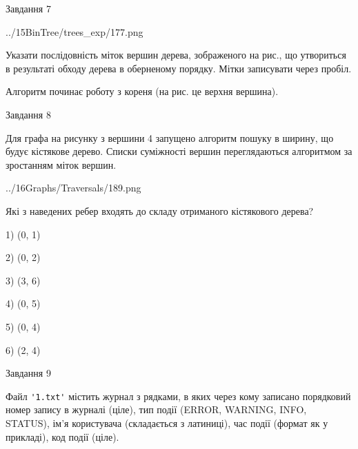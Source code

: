 \documentclass[12pt, ukrainian]{article}
\def\code#1{\Verb!#1!}
\begin{document}
{\vspace{10mm}\par

\newpage
\begin{minipage}[t]{9.7cm}
               
{\begin{center}Завдання {7}\end{center}}
\vspace{-4mm}

\begin{center}
	{../15BinTree/trees_exp/177.png}
\end{center}
Указати послідовність міток вершин дерева, зображеного на рис., що утвориться в результаті обходу дерева в оберненому порядку. Мітки записувати через пробіл.\par Алгоритм починає роботу з кореня (на рис. це верхня вершина).\par

\end{minipage}
\vline \hspace{8mm}
\begin{minipage}[t]{8.0cm}
               
{\begin{center}Завдання {8}\end{center}}
\vspace{-4mm}
Для графа на рисунку з вершини 4 запущено алгоритм пошуку в ширину, що будує кістякове дерево. Списки суміжності вершин переглядаються алгоритмом за зростанням міток вершин.\par
\begin{center}
	{../16Graphs/Traversals/189.png}
\end{center}
\par Які з наведених ребер входять до складу отриманого кістякового дерева?\par
1) (0, 1)\par
2) (0, 2)\par
3) (3, 6)\par
4) (0, 5)\par
5) (0, 4)\par
6) (2, 4)\par
{\vskip 15pt} \par

\end{minipage}

               
{\begin{center}Завдання {9}\end{center}}
\vspace{-4mm}
Файл \code{'1.txt'} містить журнал з рядками, в яких через кому записано поряд\-ко\-вий номер запису в журналі (ціле), тип події (ERROR, WARNING, INFO, STATUS), ім'я користувача (складається з латиниці), час події (фор\-мат як у прикладі), код події (ціле).

}
\end{document}
